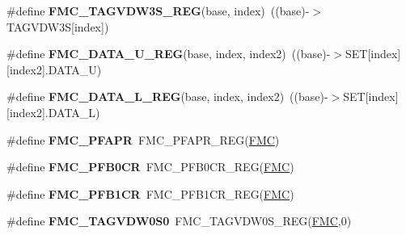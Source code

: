 \begin{DoxyCompactItemize}
\item 
\#define {\bfseries F\+M\+C\+\_\+\+T\+A\+G\+V\+D\+W3\+S\+\_\+\+R\+EG}(base,  index)~((base)-\/$>$T\+A\+G\+V\+D\+W3S\mbox{[}index\mbox{]})\hypertarget{group__FMC__Register__Accessor__Macros_ga55ed90931822defa680632f67db0ca6b}{}\label{group__FMC__Register__Accessor__Macros_ga55ed90931822defa680632f67db0ca6b}

\item 
\#define {\bfseries F\+M\+C\+\_\+\+D\+A\+T\+A\+\_\+\+U\+\_\+\+R\+EG}(base,  index,  index2)~((base)-\/$>$S\+ET\mbox{[}index\mbox{]}\mbox{[}index2\mbox{]}.D\+A\+T\+A\+\_\+U)\hypertarget{group__FMC__Register__Accessor__Macros_ga3815d67d783bd291e01211ac4c0f4a52}{}\label{group__FMC__Register__Accessor__Macros_ga3815d67d783bd291e01211ac4c0f4a52}

\item 
\#define {\bfseries F\+M\+C\+\_\+\+D\+A\+T\+A\+\_\+\+L\+\_\+\+R\+EG}(base,  index,  index2)~((base)-\/$>$S\+ET\mbox{[}index\mbox{]}\mbox{[}index2\mbox{]}.D\+A\+T\+A\+\_\+L)\hypertarget{group__FMC__Register__Accessor__Macros_ga283c734592187ae02ee61bc0f43cbfbd}{}\label{group__FMC__Register__Accessor__Macros_ga283c734592187ae02ee61bc0f43cbfbd}

\item 
\#define {\bfseries F\+M\+C\+\_\+\+P\+F\+A\+PR}~F\+M\+C\+\_\+\+P\+F\+A\+P\+R\+\_\+\+R\+EG(\hyperlink{group__FMC__Peripheral__Access__Layer_ga970254e6dadedc433f57d43709636664}{F\+MC})\hypertarget{group__FMC__Register__Accessor__Macros_gafb8a8e5f889afe248ded426a27574f2e}{}\label{group__FMC__Register__Accessor__Macros_gafb8a8e5f889afe248ded426a27574f2e}

\item 
\#define {\bfseries F\+M\+C\+\_\+\+P\+F\+B0\+CR}~F\+M\+C\+\_\+\+P\+F\+B0\+C\+R\+\_\+\+R\+EG(\hyperlink{group__FMC__Peripheral__Access__Layer_ga970254e6dadedc433f57d43709636664}{F\+MC})\hypertarget{group__FMC__Register__Accessor__Macros_ga6db90dbda9bc68851c6e87c489f18d73}{}\label{group__FMC__Register__Accessor__Macros_ga6db90dbda9bc68851c6e87c489f18d73}

\item 
\#define {\bfseries F\+M\+C\+\_\+\+P\+F\+B1\+CR}~F\+M\+C\+\_\+\+P\+F\+B1\+C\+R\+\_\+\+R\+EG(\hyperlink{group__FMC__Peripheral__Access__Layer_ga970254e6dadedc433f57d43709636664}{F\+MC})\hypertarget{group__FMC__Register__Accessor__Macros_gaaa779f6efa9e2ffa004f9820c0dd2566}{}\label{group__FMC__Register__Accessor__Macros_gaaa779f6efa9e2ffa004f9820c0dd2566}

\item 
\#define {\bfseries F\+M\+C\+\_\+\+T\+A\+G\+V\+D\+W0\+S0}~F\+M\+C\+\_\+\+T\+A\+G\+V\+D\+W0\+S\+\_\+\+R\+EG(\hyperlink{group__FMC__Peripheral__Access__Layer_ga970254e6dadedc433f57d43709636664}{F\+MC},0)\hypertarget{group__FMC__Register__Accessor__Macros_ga08d4b90c8e72268ad41591521e7df7d7}{}\label{group__FMC__Register__Accessor__Macros_ga08d4b90c8e72268ad41591521e7df7d7}


\end{DoxyCompactItemize}
